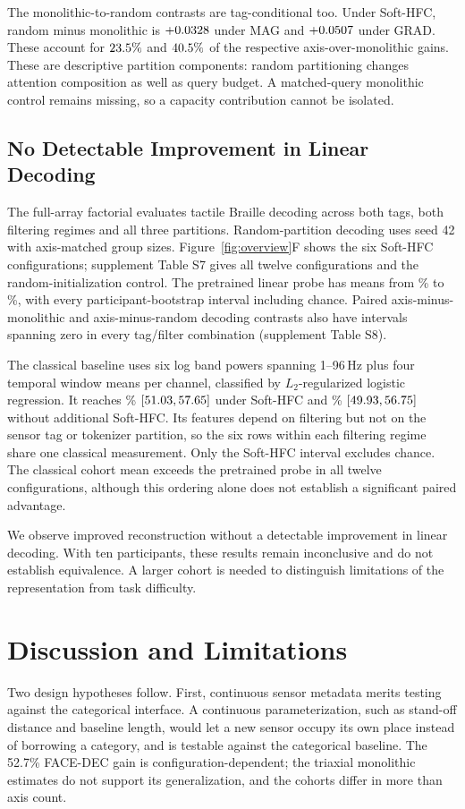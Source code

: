 The monolithic-to-random contrasts are tag-conditional too. Under Soft-HFC, random minus monolithic is $+0.0328$ under MAG and $+0.0507$ under GRAD. These account for $23.5\%$ and $40.5\%$ of the respective axis-over-monolithic gains. These are descriptive partition components: random partitioning changes attention composition as well as query budget. A matched-query monolithic control remains missing, so a capacity contribution cannot be isolated.

\subsection{No Detectable Improvement in Linear Decoding}
The full-array factorial evaluates tactile Braille decoding across both tags, both filtering regimes and all three partitions. Random-partition decoding uses seed 42 with axis-matched group sizes. Figure~\ref{fig:overview}F shows the six Soft-HFC configurations; supplement Table S7 gives all twelve configurations and the random-initialization control. The pretrained linear probe has means from \FxProbeMinimum\% to \FxProbeMaximum\%, with every participant-bootstrap interval including chance. Paired axis-minus-monolithic and axis-minus-random decoding contrasts also have intervals spanning zero in every tag/filter combination (supplement Table S8).

The classical baseline uses six log band powers spanning 1--96\,Hz plus four temporal window means per channel, classified by $L_2$-regularized logistic regression. It reaches \FxClassicalSofthfcMean\% $[51.03, 57.65]$ under Soft-HFC and \FxClassicalRawMean\% $[49.93, 56.75]$ without additional Soft-HFC. Its features depend on filtering but not on the sensor tag or tokenizer partition, so the six rows within each filtering regime share one classical measurement. Only the Soft-HFC interval excludes chance. The classical cohort mean exceeds the pretrained probe in all twelve configurations, although this ordering alone does not establish a significant paired advantage.

We observe improved reconstruction without a detectable improvement in linear decoding. With ten participants, these results remain inconclusive and do not establish equivalence. A larger cohort is needed to distinguish limitations of the representation from task difficulty.

\section{Discussion and Limitations}
Two design hypotheses follow. First, continuous sensor metadata merits testing against the categorical interface. A continuous parameterization, such as stand-off distance and baseline length, would let a new sensor occupy its own place instead of borrowing a category, and is testable against the categorical baseline. The 52.7\% FACE-DEC gain is configuration-dependent; the triaxial monolithic estimates do not support its generalization, and the cohorts differ in more than axis count.

